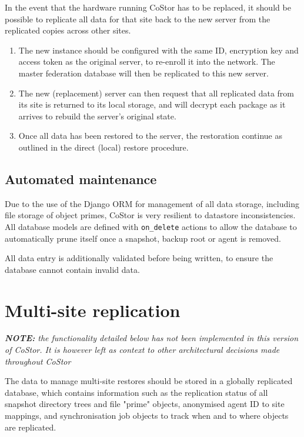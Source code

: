 \documentclass[bsc,frontabs,twoside,singlespacing,parskip,deptreport]{infthesis}     %
\begin{document}
In the event that the hardware running CoStor has to be replaced, it should be possible to replicate
all data for that site back to the new server from the replicated copies across other sites.

\begin{enumerate}
	\item The new instance should be configured with the same ID, encryption key and access 
	token as the original server, to re-enroll it into the network. The master federation 
	database will then be replicated to this new server.
	\item The new (replacement) server can then request that all replicated data from its site
	is returned to its local storage, and will decrypt each package as it arrives to rebuild
	the server's original state.
	\item Once all data has been restored to the server, the restoration continue as outlined
	in the direct (local) restore procedure.
\end{enumerate}

\section{Automated maintenance}

Due to the use of the Django ORM for management of all data storage, including file storage
of object primes, CoStor is very resilient to datastore inconsistencies. All database models
are defined with \texttt{on\_delete} actions to allow the database to automatically prune
itself once a snapshot, backup root or agent is removed.

All data entry is additionally validated before being written, to ensure the database cannot
contain invalid data.

\chapter{Multi-site replication}

\textit{\textbf{NOTE:} the functionality detailed below has not been implemented in this version of CoStor. It is however left as context to other architectural decisions made throughout CoStor}

The data to manage multi-site restores should be stored in a globally replicated database, which 
contains information such as the replication status of all snapshot directory trees and file 
"prime" objects, anonymised agent ID to site mappings, and synchronisation job objects to track
when and to where objects are replicated.
\end{document}
